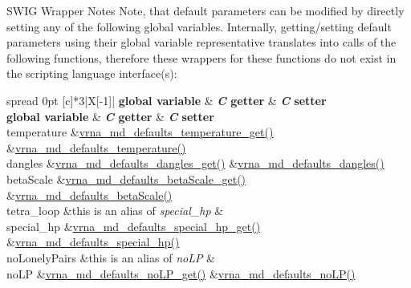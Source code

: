 \begin{DoxyRefDesc}{S\+W\+I\+G Wrapper Notes}
Note, that default parameters can be modified by directly setting any of the following global variables. Internally, getting/setting default parameters using their global variable representative translates into calls of the following functions, therefore these wrappers for these functions do not exist in the scripting language interface(s)\+:

\tabulinesep=1mm
\begin{longtabu} spread 0pt [c]{*{3}{|X[-1]}|}
\hline
\rowcolor{\tableheadbgcolor}\textbf{ global variable  }&\textbf{ {\itshape C} getter  }&\textbf{ {\itshape C} setter   }\\
\endfirsthead
\hline
\endfoot
\hline
\rowcolor{\tableheadbgcolor}\textbf{ global variable  }&\textbf{ {\itshape C} getter  }&\textbf{ {\itshape C} setter   }\\
\endhead
temperature  &\mbox{\hyperlink{group__model__details_ga96b24a74437f9ba46c4e06343155bf46}{vrna\+\_\+md\+\_\+defaults\+\_\+temperature\+\_\+get()}}  &\mbox{\hyperlink{group__model__details_gaf9e527e9a2f7e6fd6e42bc6e602f5445}{vrna\+\_\+md\+\_\+defaults\+\_\+temperature()}}   \\
dangles  &\mbox{\hyperlink{group__model__details_ga67ca06f95ae133778c79a4493c9817b8}{vrna\+\_\+md\+\_\+defaults\+\_\+dangles\+\_\+get()}}  &\mbox{\hyperlink{group__model__details_gac76a5374def8e5e4e644ff6e4cc72dee}{vrna\+\_\+md\+\_\+defaults\+\_\+dangles()}}   \\
beta\+Scale  &\mbox{\hyperlink{group__model__details_gabb8780f5410c52f970d75b044059bd09}{vrna\+\_\+md\+\_\+defaults\+\_\+beta\+Scale\+\_\+get()}}  &\mbox{\hyperlink{group__model__details_gae984567db36c3f9b8731ecc917abf3a2}{vrna\+\_\+md\+\_\+defaults\+\_\+beta\+Scale()}}   \\
tetra\+\_\+loop  &this is an alias of {\itshape special\+\_\+hp}  &\\
special\+\_\+hp  &\mbox{\hyperlink{group__model__details_ga1d68a6efdaa1253cc63fd9cd06452559}{vrna\+\_\+md\+\_\+defaults\+\_\+special\+\_\+hp\+\_\+get()}}  &\mbox{\hyperlink{group__model__details_gafff6449a02744add0308e653230c15fc}{vrna\+\_\+md\+\_\+defaults\+\_\+special\+\_\+hp()}}   \\
no\+Lonely\+Pairs  &this is an alias of {\itshape no\+LP}  &\\
no\+LP  &\mbox{\hyperlink{group__model__details_ga934344888fbacaed538bbbfe910f2aa6}{vrna\+\_\+md\+\_\+defaults\+\_\+no\+L\+P\+\_\+get()}}  &\mbox{\hyperlink{group__model__details_ga2f88ffc393ac9d7987849c965fd29ea8}{vrna\+\_\+md\+\_\+defaults\+\_\+no\+L\+P()}}   \\

\end{longtabu}
\end{DoxyRefDesc}
